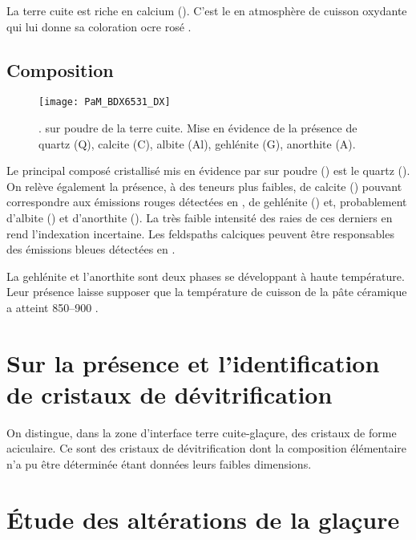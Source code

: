 La terre cuite est riche en calcium (). C'est 
le  en atmosphère de cuisson oxydante qui lui donne sa 
coloration ocre rosé \autocite{Echallier_1984}.

\subsection{Composition \cristallo}
\begin{figure}[htb]
  \texttt{[image: PaM\_BDX6531\_DX]}
  \caption[\ -- Diffraction de \RX sur poudre 
           de la terre cuite]
          {\legendeD.
           \DX[D] sur poudre de la terre cuite. 
           Mise en évidence de la présence de quartz (Q), 
           calcite (C), albite (Al), gehlénite (G), anorthite (A).}
  \label{DRX:6531}
\end{figure}

Le principal composé cristallisé mis en évidence par \DX sur poudre 
() est le quartz (\quartz). On relève également la 
présence, à des teneurs plus faibles, de calcite (\calcite) pouvant 
correspondre aux émissions rouges détectées en \CL, de gehlénite 
(\gehlenite) et, probablement d'albite (\albite) et d'anorthite 
(\anorthite). La très faible intensité des raies de ces derniers en 
rend l'indexation incertaine. Les feldspaths calciques peuvent être 
responsables des émissions bleues détectées en \CL.

La gehlénite et l'anorthite sont deux phases se développant à 
haute température. Leur présence laisse supposer que la température 
de cuisson de la pâte céramique a atteint 
\SIrange[range-phrase=\ à\ ]{850}{900}{\degC} \autocite{Peters_1978}.


\section{Sur la présence et l'identification de cristaux de 
         dévitrification}

On distingue, dans la zone d'interface terre cuite-glaçure, des 
cristaux de forme aciculaire. Ce sont des cristaux de dévitrification 
dont la composition élémentaire n'a pu être déterminée étant données 
leurs faibles dimensions.


\section{Étude des altérations de la glaçure}

